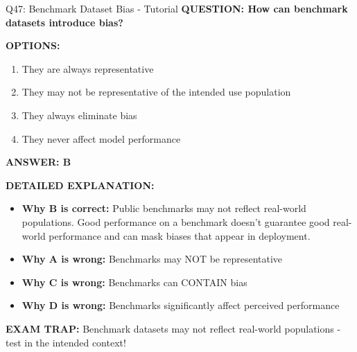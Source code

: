 \documentclass[8pt]{beamer}
\begin{document}
	\begin{frame}{Q47: Benchmark Dataset Bias - Tutorial}
		\fontsize{6.5}{7.5}\selectfont
		\textbf{QUESTION: How can benchmark datasets introduce bias?}
		
		\vspace{0.1cm}
		\textbf{OPTIONS:}
		\begin{enumerate}
			\item They are always representative
			\item They may not be representative of the intended use population
			\item They always eliminate bias
			\item They never affect model performance
		\end{enumerate}
		
		\vspace{0.1cm}
		\textcolor{myblue}{\textbf{ANSWER: B}}
		
		\vspace{0.1cm}
		\textbf{DETAILED EXPLANATION:}
		\begin{itemize}
			\item \textbf{Why B is correct:} Public benchmarks may not reflect real-world populations. Good performance on a benchmark doesn't guarantee good real-world performance and can mask biases that appear in deployment.
			\item \textbf{Why A is wrong:} Benchmarks may NOT be representative
			\item \textbf{Why C is wrong:} Benchmarks can CONTAIN bias
			\item \textbf{Why D is wrong:} Benchmarks significantly affect perceived performance
		\end{itemize}
		
		\textcolor{myred}{\textbf{EXAM TRAP:}} Benchmark datasets may \textcolor{myblue}{not reflect real-world populations} - test in the intended context!
	\end{frame}
	
\end{document}
